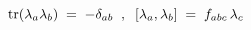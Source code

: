 \begin{equation}\label{eq:conv}
{\rm tr} (\lambda_a \lambda_b) \;=\; - \delta_{a b}\;\;,\;\;
[\lambda_a , \lambda_b ] \;=\; f_{a b c} \, \lambda_c
\end{equation}

